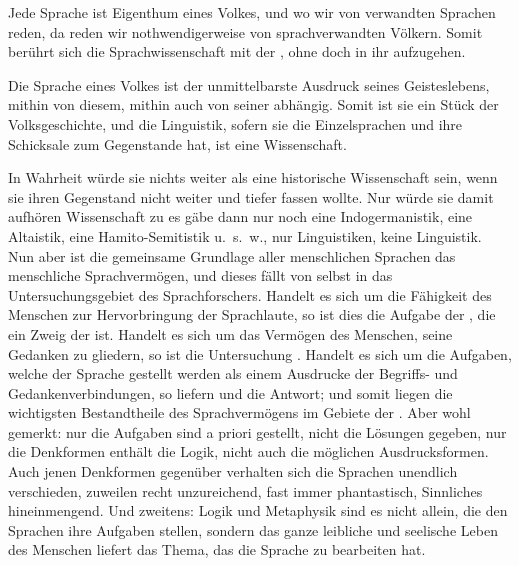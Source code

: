 \largerpage[-1]
Jede Sprache ist Eigenthum eines Volkes, und wo wir von verwandten Sprachen reden, da reden wir nothwendigerweise von sprachverwandten Völkern. Somit berührt sich die Sprachwissenschaft mit der , ohne doch in ihr aufzugehen.

Die Sprache eines Volkes ist der unmittelbarste Ausdruck seines Geisteslebens, mithin von diesem, mithin auch von seiner  abhängig. Somit ist sie ein Stück der Volksgeschichte, und die Linguistik, sofern sie die Einzelsprachen und ihre Schicksale zum Gegenstande hat, ist eine  Wissenschaft.

In Wahrheit würde sie nichts weiter als eine historische Wissen\-\label{fp.14}schaft sein, wenn sie ihren Gegenstand nicht weiter und tiefer fassen wollte. Nur würde sie damit aufhören  Wissenschaft zu  es gäbe dann nur noch eine Indogermanistik, eine Altaistik, eine Hamito-Semitistik u.~s.~w., nur Linguistiken, keine Linguistik. Nun aber ist die gemeinsame Grundlage aller menschlichen Sprachen das menschliche Sprachvermögen, und dieses fällt von selbst in das Untersuchungsgebiet des Sprachforschers. Handelt es sich um die Fähigkeit des Menschen zur Hervorbringung der Sprachlaute, so ist dies die Aufgabe der , die ein Zweig der  ist. Handelt es sich um das Vermögen des Menschen, seine Gedanken zu gliedern, so ist die Untersuchung . Handelt es sich um die Aufgaben, welche der Sprache gestellt werden als einem Ausdrucke der Begriffs- und Gedankenverbindungen, so liefern  und  die Antwort; und somit liegen die wichtigsten Bestandtheile des Sprachvermögens im Gebiete der . Aber wohl gemerkt: nur die Aufgaben sind a priori gestellt, nicht die Lösungen gegeben, nur die Denkformen enthält die Logik, nicht auch die möglichen Ausdrucksformen. Auch jenen Denkformen gegenüber verhalten sich die Sprachen unendlich verschieden, zuweilen recht unzureichend, fast immer phantastisch, Sinnliches hineinmengend. Und zweitens: Logik und Metaphysik sind es nicht allein, die den Sprachen ihre Aufgaben stellen, sondern das ganze leibliche und seelische Leben des Menschen liefert das Thema, das die Sprache zu bearbeiten hat. 

